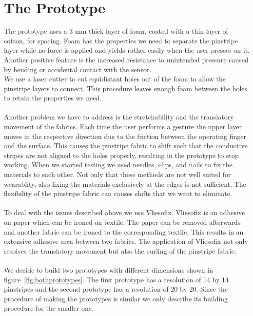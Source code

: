 \section{The Prototype}

The prototype uses a 3 mm thick layer of foam, coated with a thin layer of cotton, for spacing. Foam has the properties we need to separate the pinstripe layer while no force is applied and yields rather easily when the user presses on it. Another positive feature is the increased resistance to unintended pressure caused by bending or accidental contact with the sensor.
\\
We use a laser cutter to cut equidistant holes out of the foam to allow the pinstripe layers to connect. This procedure leaves enough foam between the holes to retain the properties we need. \\ \\
Another problem we have to address is the stretchability and the translatory movement of the fabrics. Each time the user performs a gesture the upper layer moves in the respective direction due to the friction between the operating finger and the surface. This causes the pinstripe fabric to shift such that the conductive stripes are not aligned to the holes properly, resulting in the prototype to stop working. When we started testing we used needles, clips, and nails to fix the materials to each other. Not only that these methods are not well suited for wearablity, also fixing the materials exclusively at the edges is not sufficient.  The flexibility of the pinstripe fabric can causes shifts that we want to eliminate. 
\\ \\
 To deal with the issues described above we use Vliesofix. Vliesofix is an adhesive on paper which can be ironed on textile. The paper can be removed afterwards and another fabric can be ironed to the corresponding textile. This results in an extensive adhesive area between two fabrics. The application of Vliesofix not only resolves the translatory movement but also the curling of the pinstripe fabric.
\\ \\
We decide to build two prototypes with different dimensions shown in figure~\ref{fig:bothprototypes}. The first prototype has a resolution of 14 by 14 pinstripes and the second prototype has a resolution of 20 by 20. Since the procedure of making the prototypes is similar we only describe its building procedure for the smaller one. 
